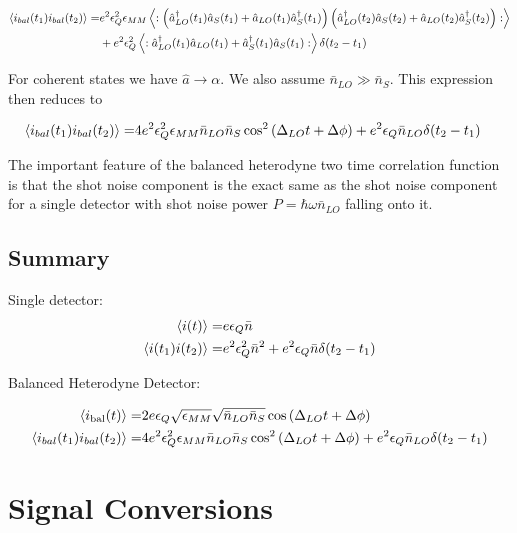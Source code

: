 \documentclass[12pt]{article}
\newcommand{\ep}{\epsilon}
\begin{document}
\begin{align}
\Braket{i_{bal}(t_1)i_{bal}(t_2)} =& e^2 \ep_Q^2\ep_{MM}\Braket{:\left(\hat{a}^{\dag}_{LO}(t_1)\hat{a}_S(t_1) + \hat{a}_{LO}(t_1)\hat{a}^{\dag}_S(t_1)\right)\left(\hat{a}^{\dag}_{LO}(t_2)\hat{a}_S(t_2) + \hat{a}_{LO}(t_2)\hat{a}^{\dag}_S(t_2)\right) :}\\
&+ e^2\ep_Q^2 \Braket{:\hat{a}^{\dag}_{LO}(t_1)\hat{a}_{LO}(t_1) + \hat{a}^{\dag}_S(t_1)\hat{a}_S(t_1) :} \delta(t_2-t_1)
\end{align}

For coherent states we have $\hat{a}\rightarrow \alpha$.
We also assume $\bar{n}_{LO} \gg \bar{n}_S$.
This expression then reduces to

\begin{align}
\Braket{i_{bal}(t_1)i_{bal}(t_2)} =& 4e^2\ep_Q^2\ep_{MM}\bar{n}_{LO}\bar{n}_S \cos^2\left(\Delta_{LO}t + \Delta \phi\right) + e^2\ep_Q \bar{n}_{LO}\delta(t_2-t_1)
\end{align}

The important feature of the balanced heterodyne two time correlation function is that the shot noise component is the exact same as the shot noise component for a single detector with shot noise power $P = \hbar \omega \bar{n}_{LO}$ falling onto it.

\subsection{Summary}

Single detector:
\begin{align}
\Braket{i(t)} =& e\ep_Q \bar{n}\\
\Braket{i(t_1)i(t_2)} =& e^2 \ep_Q^2 \bar{n}^2 + e^2 \ep_Q \bar{n} \delta(t_2-t_1) 
\end{align}

Balanced Heterodyne Detector:

\begin{align}
\Braket{i_{\text{bal}}(t)} =& 2e\ep_Q\sqrt{\ep_{MM}}\sqrt{\bar{n}_{LO}\bar{n}_S} \cos\left(\Delta_{LO} t + \Delta\phi\right)\\
\Braket{i_{bal}(t_1)i_{bal}(t_2)} =& 4e^2\ep_Q^2\ep_{MM}\bar{n}_{LO}\bar{n}_S \cos^2\left(\Delta_{LO}t + \Delta \phi\right) + e^2\ep_Q \bar{n}_{LO}\delta(t_2-t_1)
\end{align}




\section{Signal Conversions}
\end{document}
